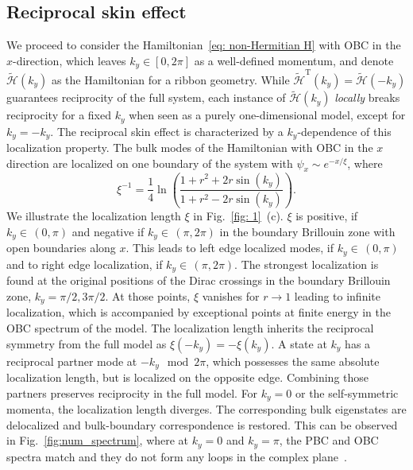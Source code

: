 \subsection{Reciprocal skin effect}
We proceed to consider the Hamiltonian~\eqref{eq: non-Hermitian H} with OBC in the $x$-direction, which leaves $k_y \in [0,2\pi]$ as a well-defined momentum, and denote $\tilde{\mathcal{H}}(k_y)$ as the Hamiltonian for a ribbon geometry. While $\tilde{\mathcal{H}}^{\mathrm{T}} (k_y) = \tilde{\mathcal{H}}(-k_y)$ guarantees reciprocity of the full system, each instance of $\tilde{\mathcal{H}}(k_y)$ \textit{locally} breaks reciprocity for a fixed $k_y$ when seen as a purely one-dimensional model, except for $k_y = - k_y$. The reciprocal skin effect is characterized by a $k_y$-dependence of this localization property. The bulk modes of the Hamiltonian with OBC in the $x$ direction are localized on one boundary of the system with $\psi_x \sim e^{-x/\xi}$, where 
\begin{equation}
\xi^{-1} = \frac{1}{4} \ln\left(\frac{1+r^2+2 r \sin(k_y)}{1+r^2-2 r \sin(k_y)}\right).
\label{eq:local_leng}
\end{equation}
We illustrate the localization length $\xi$ in Fig.~\ref{fig: 1}~(c). $\xi$ is positive, if $k_y \in \, (0,\pi)$ and negative if $k_y \in \, (\pi,2\pi)$ in the boundary Brillouin zone with open boundaries along $x$. This leads to left edge localized modes, if $k_y \in \, (0,\pi)$ and to right edge localization, if $k_y \in \, (\pi,2\pi)$. The strongest localization is found at the original positions of the Dirac crossings in the boundary Brillouin zone,  $k_y = \pi/2, 3\pi/2$.  At those points, $\xi$ vanishes for $r\rightarrow 1$ leading to infinite localization, which is accompanied by exceptional points at finite energy in the OBC spectrum of the model. The localization length inherits the reciprocal symmetry from the full model as $\xi(-k_y) = -\xi(k_y)$. A state at $k_y$ has a reciprocal partner mode at $-k_y \mod 2\pi$, which possesses the same absolute localization length, but is localized on the opposite edge. Combining those partners preserves reciprocity in the full model. For $k_y = 0$ or the self-symmetric momenta, the localization length diverges. The corresponding bulk eigenstates are delocalized and bulk-boundary correspondence is restored. This can be observed in Fig.~\ref{fig:num_spectrum}, where at $k_y = 0$ and $k_y = \pi$, the PBC and OBC spectra match and they do not form any loops in the complex plane~\cite{okuma2019topological, zhang2019correspondence}. 

